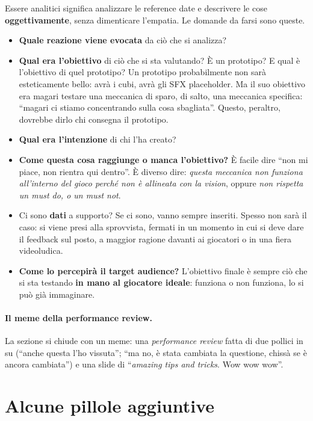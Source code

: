 Essere analitici significa analizzare le reference date e descrivere le
cose \textbf{oggettivamente}, senza dimenticare l'empatia. Le domande da
farsi sono queste.
\begin{itemize}
  \item \textbf{Quale reazione viene evocata} da ciò che si analizza?
  \item \textbf{Qual era l'obiettivo} di ciò che si sta valutando? È un
        prototipo? E qual è l'obiettivo di quel prototipo? Un prototipo
        probabilmente non sarà esteticamente bello: avrà i cubi, avrà gli
        SFX placeholder. Ma il suo obiettivo era magari testare una
        meccanica di sparo, di salto, una meccanica specifica: ``magari ci
        stiamo concentrando sulla cosa sbagliata''. Questo, peraltro,
        dovrebbe dirlo chi consegna il prototipo.
  \item \textbf{Qual era l'intenzione} di chi l'ha creato?
  \item \textbf{Come questa cosa raggiunge o manca l'obiettivo?} È facile
        dire ``non mi piace, non rientra qui dentro''. È diverso dire:
        \emph{questa meccanica non funziona all'interno del gioco perché non
        è allineata con la vision}, oppure \emph{non rispetta un must do, o
        un must not}.
  \item Ci sono \textbf{dati} a supporto? Se ci sono, vanno sempre
        inseriti. Spesso non sarà il caso: si viene presi alla sprovvista,
        fermati in un momento in cui si deve dare il feedback sul posto, a
        maggior ragione davanti ai giocatori o in una fiera videoludica.
  \item \textbf{Come lo percepirà il target audience?} L'obiettivo finale è
        sempre ciò che si sta testando \textbf{in mano al giocatore ideale}:
        funziona o non funziona, lo si può già immaginare.
\end{itemize}

\paragraph{Il meme della performance review.} La sezione si chiude con un
meme: una \emph{performance review} fatta di due pollici in su (``anche
questa l'ho vissuta''; ``ma no, è stata cambiata la questione, chissà se è
ancora cambiata'') e una slide di ``\emph{amazing tips and tricks}. Wow wow
wow''.

\section{Alcune pillole aggiuntive}
\label{gd10:sec:pillole}


